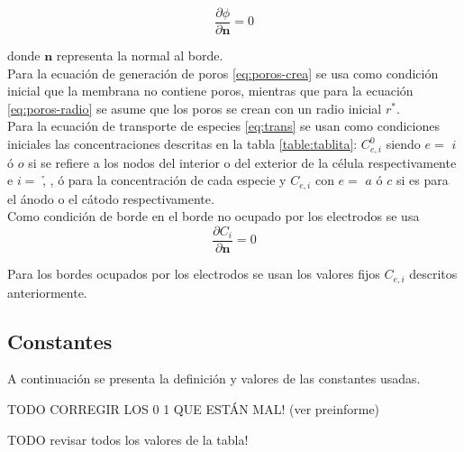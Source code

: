 \begin{equation}
	\frac{\partial \phi}{\partial \mathbf{n}} = 0
\end{equation}

donde $\mathbf{n}$ representa la normal al borde.\\

Para la ecuación de generación de poros \ref{eq:poros-crea} se usa como condición inicial que la membrana no contiene poros, mientras que para la ecuación \ref{eq:poros-radio} se asume que los poros se crean con un radio inicial $r^*$.\\

Para la ecuación de transporte de especies \ref{eq:trans} se usan como condiciones iniciales las concentraciones descritas en la tabla \ref{table:tablita}: $C_{e, i}^0$ siendo $e =$ $i$ ó $o$ si se refiere a los nodos del interior o del exterior de la célula respectivamente e $i =$ \h, \oh, \na ó \cl para la concentración de cada especie y $C_{e,i}$ con $e =$ $a$ ó $c$ si es para el ánodo o el cátodo respectivamente.\\

Como condición de borde en el borde no ocupado por los electrodos se usa
\begin{equation}
	\frac{\partial C_i}{\partial \mathbf{n}} = 0
\end{equation}

Para los bordes ocupados por los electrodos se usan los valores fijos $C_{e,i}$ descritos anteriormente.


\subsection{Constantes}
A continuación se presenta la definición y valores de las constantes usadas.

TODO CORREGIR LOS 0 1 QUE ESTÁN MAL! (ver preinforme)

TODO revisar todos los valores de la tabla!

\newcommand{\lineaTabla}[3]{ ${#1}$ & {#3} & {#2} \\ }

\newcommand{\anodo}[3] {
	\lineaTabla{C_{a,{#1}}}{\num{#2} \si{#3}}{Concentración de #1 en el ánodo}
}

\newcommand{\catodo}[3] {
	\lineaTabla{C_{c,{#1}}}{\num{#2} \si{#3}}{Concentración de #1 en el cátodo}
}


